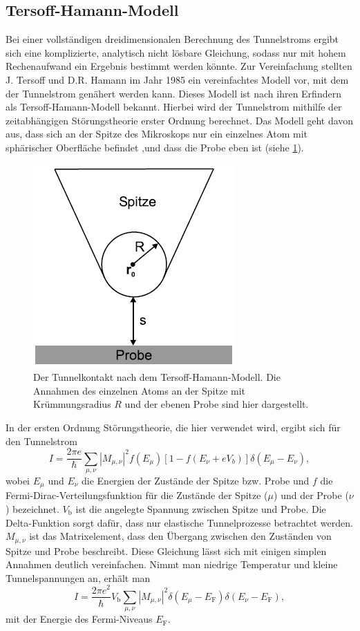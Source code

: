 \documentclass[
	a4paper,
	12pt,
	pagesize,
	ngerman
]{scrartcl}
\begin{document}
\subsection{Tersoff-Hamann-Modell}
Bei einer vollständigen dreidimensionalen Berechnung des Tunnelstroms ergibt sich eine komplizierte, analytisch nicht lösbare Gleichung, sodass nur mit hohem Rechenaufwand ein Ergebnis bestimmt werden könnte. Zur Vereinfachung stellten J. Tersoff und D.R. Hamann im Jahr 1985 ein vereinfachtes Modell vor, mit dem der Tunnelstrom genähert werden kann. Dieses Modell ist nach ihren Erfindern als Tersoff-Hamann-Modell bekannt. Hierbei wird der Tunnelstrom mithilfe der zeitabhängigen Störungstheorie erster Ordnung berechnet. Das Modell geht davon aus, dass sich an der Spitze des Mikroskops nur ein einzelnes Atom mit sphärischer Oberfläche befindet ,und dass die Probe eben ist (siehe \cref{spitze}).

\begin{figure}[h!]
	\centering
	\includegraphics[scale=0.8]{spitze.png}
	\caption{Der Tunnelkontakt nach dem Tersoff-Hamann-Modell. Die Annahmen des einzelnen Atoms an der Spitze mit Krümmungsradius $R$ und der ebenen Probe sind hier dargestellt.}
	\label{spitze}
\end{figure}

In der ersten Ordnung Störungstheorie, die hier verwendet wird, ergibt sich für den Tunnelstrom
\begin{equation}
	I = \frac{2\pi e}{\hbar} \sum_{\mu, \nu} |M_{\mu,\nu}|^2 f(E_\mu)[1-f(E_\nu + eV_b)] \delta(E_\mu - E_\nu),
	\label{eq:I1}
\end{equation}
wobei $E_\mu$ und $E_\nu$ die Energien der Zustände der Spitze bzw. Probe und $f$ die Fermi-Dirac-Verteilungsfunktion für die Zustände der Spitze ($\mu$) und der Probe ($\nu$) bezeichnet. $V_\text{b}$ ist die angelegte Spannung zwischen Spitze und Probe. Die Delta-Funktion sorgt dafür, dass nur elastische Tunnelprozesse betrachtet werden. $M_{\mu,\nu}$ ist das Matrixelement, dass den Übergang zwischen den Zuständen von Spitze und Probe beschreibt. Diese Gleichung lässt sich mit einigen simplen Annahmen deutlich vereinfachen. Nimmt man niedrige Temperatur und kleine Tunnelspannungen an, erhält man
\begin{equation}
	I = \frac{2\pi e^2}{\hbar}V_\text{b} \sum_{\mu, \nu} |M_{\mu,\nu}|^2 \delta(E_\mu - E_\text{F}) \delta(E_\nu - E_\text{F}),
	\label{eq:I2}
\end{equation}
mit der Energie des Fermi-Niveaus $E_\text{F}$.
\end{document}
